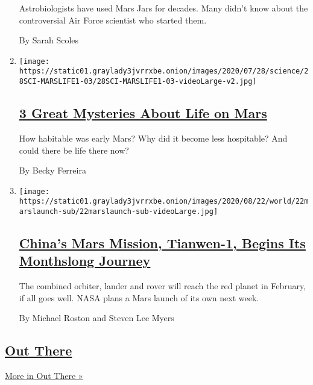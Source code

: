\begin{enumerate}
  Astrobiologists have used Mars Jars for decades. Many didn't know
  about the controversial Air Force scientist who started them.

  By Sarah Scoles
\item
  \texttt{[image: https://static01.graylady3jvrrxbe.onion/images/2020/07/28/science/28SCI-MARSLIFE1-03/28SCI-MARSLIFE1-03-videoLarge-v2.jpg]}

  \hypertarget{3-great-mysteries-about-life-on-mars}{%
  \subsection{\texorpdfstring{\href{/2020/07/24/science/mars-life-water.html}{3
  Great Mysteries About Life on
  Mars}}{3 Great Mysteries About Life on Mars}}\label{3-great-mysteries-about-life-on-mars}}

  How habitable was early Mars? Why did it become less hospitable? And
  could there be life there now?

  By Becky Ferreira
\item
  \texttt{[image: https://static01.graylady3jvrrxbe.onion/images/2020/08/22/world/22marslaunch-sub/22marslaunch-sub-videoLarge.jpg]}

  \hypertarget{chinas-mars-mission-tianwen-1-begins-its-monthslong-journey}{%
  \subsection{\texorpdfstring{\href{/2020/07/22/science/mars-china-launch.html}{China's
  Mars Mission, Tianwen-1, Begins Its Monthslong
  Journey}}{China's Mars Mission, Tianwen-1, Begins Its Monthslong Journey}}\label{chinas-mars-mission-tianwen-1-begins-its-monthslong-journey}}

  The combined orbiter, lander and rover will reach the red planet in
  February, if all goes well. NASA plans a Mars launch of its own next
  week.

  By Michael Roston and Steven Lee Myers
\end{enumerate}

\hypertarget{out-there-2}{%
\subsection{\texorpdfstring{\href{/column/out-there}{Out
There}}{Out There}}\label{out-there-2}}

\href{/column/out-there}{More in Out There »}


